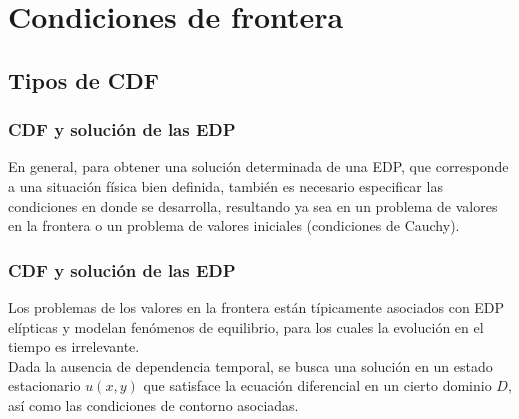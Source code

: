 \section{Condiciones de frontera}
\subsection{Tipos de CDF}
\begin{frame}
\frametitle{CDF y solución de las EDP}
En general, para obtener una solución determinada de una EDP, que corresponde a una situación física bien definida, también es necesario especificar las condiciones en donde se desarrolla, resultando ya sea en un problema de valores en la frontera o un problema de valores iniciales (condiciones de Cauchy).
\end{frame}
\begin{frame}
\frametitle{CDF y solución de las EDP}
Los problemas de los valores en la frontera están típicamente asociados con EDP elípticas y modelan fenómenos de equilibrio, para los cuales la evolución en el tiempo es irrelevante.
\\
\bigskip
Dada la ausencia de dependencia temporal, se busca una solución en un estado estacionario $u(x, y)$ que satisface la ecuación diferencial en un cierto dominio $D$, así como las condiciones de contorno asociadas. 
\end{frame}
